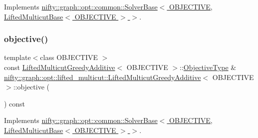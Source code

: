 Implements \hyperlink{classnifty_1_1graph_1_1opt_1_1common_1_1SolverBase_af638b9a804cfec3e35fe87c77e942d30}{nifty\+::graph\+::opt\+::common\+::\+Solver\+Base$<$ O\+B\+J\+E\+C\+T\+I\+V\+E, Lifted\+Multicut\+Base$<$ O\+B\+J\+E\+C\+T\+I\+V\+E $>$ $>$}.

\mbox{\label{classnifty_1_1graph_1_1opt_1_1lifted__multicut_1_1LiftedMulticutGreedyAdditive_a7c936b75edaaa2ae36f0a9d52dcef156}} 
\subsubsection{\texorpdfstring{objective()}{objective()}}
{\footnotesize\ttfamily template$<$class O\+B\+J\+E\+C\+T\+I\+VE $>$ \\
const \hyperlink{classnifty_1_1graph_1_1opt_1_1lifted__multicut_1_1LiftedMulticutGreedyAdditive}{Lifted\+Multicut\+Greedy\+Additive}$<$ O\+B\+J\+E\+C\+T\+I\+VE $>$\+::\hyperlink{classnifty_1_1graph_1_1opt_1_1lifted__multicut_1_1LiftedMulticutGreedyAdditive_a0aa12ac484718da875bfca390b69811e}{Objective\+Type} \& \hyperlink{classnifty_1_1graph_1_1opt_1_1lifted__multicut_1_1LiftedMulticutGreedyAdditive}{nifty\+::graph\+::opt\+::lifted\+\_\+multicut\+::\+Lifted\+Multicut\+Greedy\+Additive}$<$ O\+B\+J\+E\+C\+T\+I\+VE $>$\+::objective (\begin{DoxyParamCaption}{ }\end{DoxyParamCaption}) const\hspace{0.3cm}{\ttfamily [virtual]}}



Implements \hyperlink{classnifty_1_1graph_1_1opt_1_1common_1_1SolverBase_a55e9eb645c07d6e0782ebfb990ab3c84}{nifty\+::graph\+::opt\+::common\+::\+Solver\+Base$<$ O\+B\+J\+E\+C\+T\+I\+V\+E, Lifted\+Multicut\+Base$<$ O\+B\+J\+E\+C\+T\+I\+V\+E $>$ $>$}.

\mbox{\label{classnifty_1_1graph_1_1opt_1_1lifted__multicut_1_1LiftedMulticutGreedyAdditive_a789ec7244197f382b320f72606b50a8e}} 
